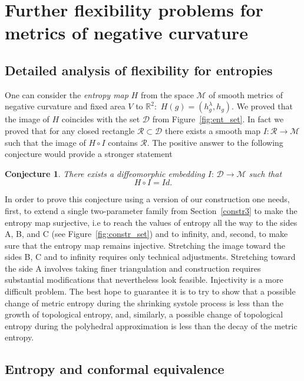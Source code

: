 \documentclass[12pt]{article}
\numberwithin{equation}{section}
\newtheorem{conjecture}{Conjecture}
\theoremstyle{definition}
\begin{document}
\section {Further flexibility problems for metrics of negative curvature}\label{section:open}
\subsection{Detailed analysis of  flexibility for entropies}

One can consider the {\em entropy map} $H$ from the space $\mathcal M$  of smooth metrics of negative curvature and fixed area $V$ to $\mathbb R^2:\,\, H(g)=(h_g^\lambda, h_g)$. We proved that   the image of $H$ coincides with the set $\mathcal D$ from Figure~\ref{fig:ent_set}. In fact we proved that for any closed rectangle $\mathcal R\subset\mathcal D$ there exists a smooth map $I\colon \mathcal R\to \mathcal M$  such that the image of  $H\circ  I $ contains $ \mathcal R$. The  positive answer to the following conjecture would  provide a stronger statement 

\begin{conjecture} There exists a diffeomorphic embedding $I\colon\, \mathcal D\to \mathcal M$ such that 
$$H\circ I=Id.$$
\end{conjecture}

In order to prove this conjecture using a version of our construction  one needs, first, to extend  a single  two-parameter family from Section~\ref{constr3} to make the entropy map surjective, i.e to reach the values of entropy all the way to the sides A, B, and C  (see Figure~\ref{fig:constr_set}) and to infinity, and, second, to make sure that the entropy map remains injective. Stretching the image toward the sides B, C and to infinity requires only technical adjustments. Stretching toward the side A involves taking  finer triangulation and construction requires substantial modifications that nevertheless look feasible. Injectivity is a more difficult problem. The best hope to guarantee it  is to try to show that a  possible change of metric entropy during the shrinking systole process is less than the growth of topological entropy, and, similarly, a possible change of topological entropy during the polyhedral approximation is less than the decay of the metric entropy. 

\subsection{Entropy and conformal equivalence}
\end{document}
